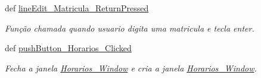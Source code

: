 \begin{DoxyCompactItemize}
\item 
\hypertarget{classview_1_1Controle__De__Acesso__Window_a222ab9bfa257580e96d7e539bce7bb4e}{def \hyperlink{classview_1_1Controle__De__Acesso__Window_a222ab9bfa257580e96d7e539bce7bb4e}{line\-Edit\-\_\-\-Matricula\-\_\-\-Return\-Pressed}}\label{classview_1_1Controle__De__Acesso__Window_a222ab9bfa257580e96d7e539bce7bb4e}

\begin{DoxyCompactList}\small\item\em \-Função chamada quando usuario digita uma matricula e tecla enter. \end{DoxyCompactList}\item 
\hypertarget{classview_1_1Controle__De__Acesso__Window_a1cb5812c6ae57bf9cb0a9ba3f32d22da}{def \hyperlink{classview_1_1Controle__De__Acesso__Window_a1cb5812c6ae57bf9cb0a9ba3f32d22da}{push\-Button\-\_\-\-Horarios\-\_\-\-Clicked}}\label{classview_1_1Controle__De__Acesso__Window_a1cb5812c6ae57bf9cb0a9ba3f32d22da}

\begin{DoxyCompactList}\small\item\em \-Fecha a janela \hyperlink{classview_1_1Horarios__Window}{\-Horarios\-\_\-\-Window} e cria a janela \hyperlink{classview_1_1Horarios__Window}{\-Horarios\-\_\-\-Window}. \end{DoxyCompactList}\end{DoxyCompactItemize}
